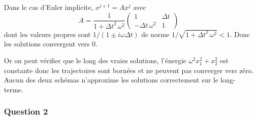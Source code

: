 Dans le cas d'Euler implicite, \(x^{j+1}=Ax^j\) avec \[
A = \frac{1}{1+{\Delta t}^2 \, \omega^2} \left(
\begin{matrix}
1 & {\Delta t}\\
-{\Delta t}\, \omega^2 & 1
\end{matrix}
\right)
\] dont les valeurs propres sont \(1/(1 \pm i\omega {\Delta t})\) de
norme \(1/\sqrt{1+{\Delta t}^2 \, \omega^2}<1\). Donc les solutions
convergent vers 0.

Or on peut vérifier que le long des vraies solutions, l'énergie
\(\omega^2 x_1^2 + x_2^2\) est constante donc les trajectoires sont
bornées et ne peuvent pas converger vers zéro. Aucun des deux schémas
n'approxime les solutions correctement sur le long-terme.

\hypertarget{ed2-answer-symp-2}{%
\subsubsection*{Question 2}\label{ed2-answer-symp-2}}


